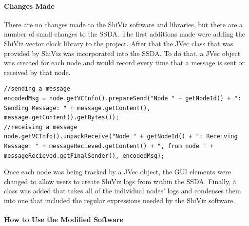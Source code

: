 \documentclass[12pt, oneside]{article}   	%
\begin{document}
\paragraph{Changes Made}

There are no changes made to the ShiViz software and libraries, but there are a number of small changes to the SSDA.  The first additions made were adding the ShiViz vector clock library to the project.  After that the JVec class that was provided by ShiViz was incorporated into the SSDA.  To do that, a JVec object was created for each node and would record every time that a message is sent or received by that node. \begin{lstlisting}
//sending a message
encodedMsg = node.getVCInfo().prepareSend("Node " + getNodeId() + ": Sending Message: " + message.getContent(), message.getContent().getBytes());
//receiving a message
node.getVCInfo().unpackReceive("Node " + getNodeId() + ": Receiving Message: " + messageRecieved.getContent() + ", from node " + messageRecieved.getFinalSender(), encodedMsg);
\end{lstlisting}
Once each node was being tracked by a JVec object, the GUI elements were changed to allow users to create ShiViz logs from within the SSDA.  Finally, a class was added that takes all of the individual nodes' logs and condenses them into one that included the regular expressions needed by the ShiViz software.

\paragraph{How to Use the Modified Software}
\end{document}
